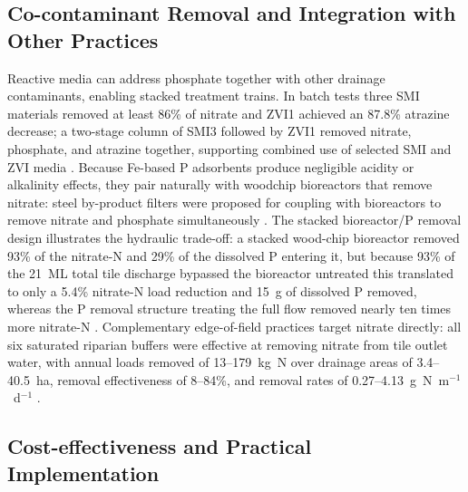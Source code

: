 \documentclass[11pt]{article}
\begin{document}
\subsection{Co-contaminant Removal and Integration with Other Practices}

Reactive media can address phosphate together with other drainage contaminants,
enabling stacked treatment trains. In batch tests three SMI materials removed at
least 86\% of nitrate and ZVI1 achieved an 87.8\% atrazine decrease; a two-stage
column of SMI3 followed by ZVI1 removed nitrate, phosphate, and atrazine together,
supporting combined use of selected SMI and ZVI media \parencite{Allred2012}.
Because Fe-based P adsorbents produce negligible acidity or alkalinity effects,
they pair naturally with woodchip bioreactors that remove nitrate: steel
by-product filters were proposed for coupling with bioreactors to remove nitrate
and phosphate simultaneously \parencite{Sellner2019b}. The stacked bioreactor/P
removal design illustrates the hydraulic trade-off: a stacked wood-chip bioreactor
removed 93\% of the nitrate-N and 29\% of the dissolved P entering it, but because
93\% of the 21~ML total tile discharge bypassed the bioreactor untreated this
translated to only a 5.4\% nitrate-N load reduction and 15~g of dissolved P
removed, whereas the P removal structure treating the full flow removed nearly
ten times more nitrate-N \parencite{Penn2024}. Complementary edge-of-field
practices target nitrate directly: all six saturated riparian buffers were
effective at removing nitrate from tile outlet water, with annual loads removed of
13--179~kg~N over drainage areas of 3.4--40.5~ha, removal effectiveness of 8--84\%,
and removal rates of 0.27--4.13~g~N~m$^{-1}$~d$^{-1}$ \parencite{Jaynes2019}.

\subsection{Cost-effectiveness and Practical Implementation}
\end{document}

